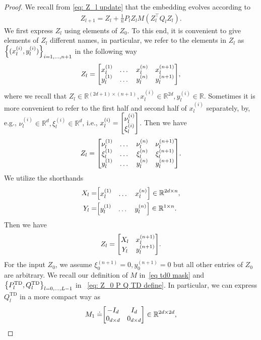 \documentclass{article}
\newcommand{\R}{\mathbb{R}}
\newcommand{\td}{\text{TD}}
\begin{document}
\begin{proof}
    We recall from \eqref{eq: Z_l update} that the embedding evolves according to
    \begin{align}
        Z_{l+1} = Z_l + \frac{1}{n} P_l Z_l M(Z_l^\top Q_l Z_l).
    \end{align}
    We first express $Z_l$ using elements of $Z_0$.
    To this end,
    it is convenient to give elements of $Z_l$ different names,
    in particular,
    we refer to the elements in $Z_l$ as $\qty{(x^{(i)}_l, y^{(i)}_l)}_{i=1,\dots, n+1}$ in the following way
    \begin{align}
        Z_l = \mqty[x_l^{(1)} & \dots & x_l^{(n)} & x_l^{(n+1)} \\ y_l^{(1)} & \dots & y_l^{(n)} & y_l^{(n+1)}],
    \end{align}
    where we recall that $Z_l \in \R^{(2d + 1) \times (n+1)}, x_l^{(i)} \in \R^{2d}, y^{(i)}_l \in \R$.
    Sometimes it is more convenient to refer to the first half and second half of $x_l^{(i)}$ separately, 
    by, e.g., $\nu^{(i)}_l \in \R^d, \xi_l^{(i)} \in \R^d$, i.e., $x_l^{(i)} = \mqty[\nu_l^{(i)} \\ \xi_l^{(i)}]$.
    Then we have
    \begin{align}
        Z_l = \mqty[\nu_l^{(1)} & \dots & \nu_l^{(n)} & \nu_l^{(n+1)} \\
        \xi_l^{(1)} & \dots & \xi_l^{(n)} & \xi_l^{(n+1)} \\
         y_l^{(1)} & \dots & y_l^{(n)} & y_l^{(n+1)}].
    \end{align}
    We utilize the shorthands
    \begin{align}
        X_l =& \mqty[x_l^{(1)} & \dots & x_l^{(n)}] \in \R^{2d \times n}, \\
        Y_l =&  \mqty[y_l^{(1)} & \dots & y_l^{(n)}] \in \R^{1 \times n}.
    \end{align}
    Then we have
    \begin{align}
        Z_l = \mqty[X_l & x_l^{(n+1)} \\ Y_l & y_l^{(n+1)}]. \label{eq: z_l blockwise X Y}
    \end{align}
    For the input $Z_0$,
    we assume $\xi_0^{(n+1)} = 0, y_0^{(n+1)} = 0$ but all other entries of $Z_0$ are arbitrary.
    We recall our definition of $M$ in~\eqref{eq td0 mask} and $\qty{P_l^\td, Q_l^\td}_{l=0,\dots,L-1}$ in ~\eqref{eq: Z_0 P Q TD define}.
    In particular,
    we can express $Q_l^{\td}$ in a more compact way as
\begin{align}
  M_1 \doteq& \mqty[-I_{d} & I_{d} \\0_{d \times d} & 0_{d \times d}] \in \R^{2d \times 2d}, \label{eq:M_1 define}\\

\end{align}
\end{proof}
\end{document}
